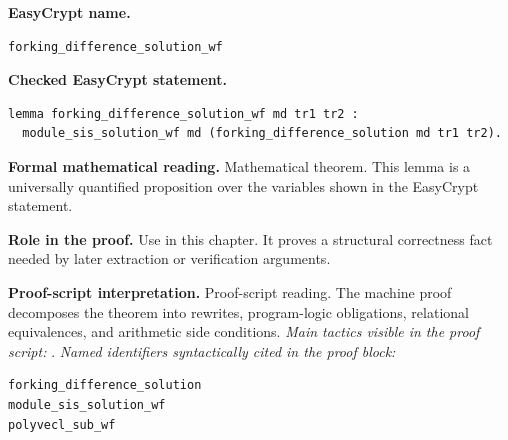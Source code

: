 \begin{formaltheorem}
\noindent\textbf{EasyCrypt name.}
\begin{lstlisting}[language=EasyCrypt,basicstyle=\ttfamily\scriptsize]
forking_difference_solution_wf
\end{lstlisting}
\noindent\textbf{Checked EasyCrypt statement.}
\begin{lstlisting}[language=EasyCrypt,basicstyle=\ttfamily\scriptsize]
lemma forking_difference_solution_wf md tr1 tr2 :
  module_sis_solution_wf md (forking_difference_solution md tr1 tr2).
\end{lstlisting}
\noindent\textbf{Formal mathematical reading.}
Mathematical theorem. This lemma is a universally quantified proposition over the variables shown in the EasyCrypt statement.

\noindent\textbf{Role in the proof.}
Use in this chapter. It proves a structural correctness fact needed by later extraction or verification arguments.

\noindent\textbf{Proof-script interpretation.}
Proof-script reading. The machine proof decomposes the theorem into rewrites, program-logic obligations, relational equivalences, and arithmetic side conditions.
\emph{Main tactics visible in the proof script:} .
\emph{Named identifiers syntactically cited in the proof block:}
\begin{lstlisting}[language=EasyCrypt,basicstyle=\ttfamily\scriptsize]
forking_difference_solution
module_sis_solution_wf
polyvecl_sub_wf
\end{lstlisting}

\end{formaltheorem}

